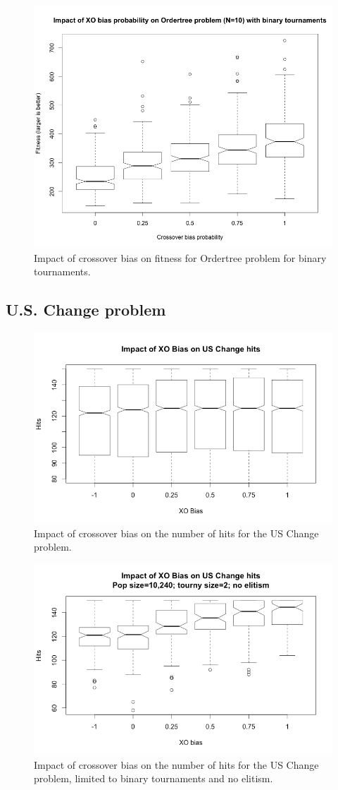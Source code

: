 \documentclass{sig-alternate}
\begin{document}
\begin{figure}
\centering
\includegraphics[width=0.45 \textwidth]{Plots/Ordertree_XO_bias_prob_binary_tournaments.png}
\caption{Impact of crossover bias on fitness for Ordertree problem for binary tournaments.}
\label{fig:Ordertree_results_binary_tournaments}
\end{figure}

\subsection{U.S. Change problem}

\begin{figure}
\centering
\includegraphics[width=0.45 \textwidth]{Plots/US_change_hits.png}
\caption{Impact of crossover bias on the number of hits for the US Change problem.}
\label{fig:USChange_Hits}
\end{figure}

\begin{figure}
\centering
\includegraphics[width=0.45 \textwidth]{Plots/US_change_hits_tourny2_noElitism.png}
\caption{Impact of crossover bias on the number of hits for the US Change problem, limited to binary tournaments and no elitism.}
\label{fig:USChange_Hits_tourny2_noElitism}
\end{figure}
\end{document}
